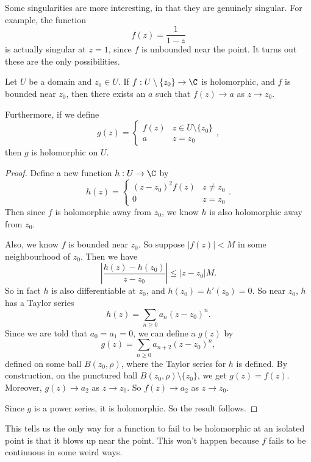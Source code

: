 \documentclass[a4paper]{article}
\begin{document}
Some singularities are more interesting, in that they are genuinely singular. For example, the function
\[
  f(z) = \frac{1}{1 - z}
\]
is actually singular at $z = 1$, since $f$ is unbounded near the point. It turns out these are the only possibilities.

\begin{prop}
  Let $U$ be a domain and $z_0 \in U$. If $f: U \setminus \{z_0\} \to \C$ is holomorphic, and $f$ is bounded near $z_0$, then there exists an $a$ such that $f(z) \to a$ as $z \to z_0$.

  Furthermore, if we define
  \[
    g(z) =
    \begin{cases}
      f(z) & z \in U \setminus \{z_0\}\\
      a & z = z_0
    \end{cases},
  \]
  then $g$ is holomorphic on $U$.
\end{prop}

\begin{proof}
  Define a new function $h: U \to \C$ by
  \[
    h(z) =
    \begin{cases}
      (z - z_0)^2 f(z) & z \not= z_0\\
      0 & z = z_0
    \end{cases}.
  \]
  Then since $f$ is holomorphic away from $z_0$, we know $h$ is also holomorphic away from $z_0$.

  Also, we know $f$ is bounded near $z_0$. So suppose $|f(z)| < M$ in some neighbourhood of $z_0$. Then we have
  \[
    \left|\frac{h(z) - h(z_0)}{ z - z_0}\right| \leq |z - z_0| M.
  \]
  So in fact $h$ is also differentiable at $z_0$, and $h(z_0) = h'(z_0) = 0$. So near $z_0$, $h$ has a Taylor series
  \[
    h(z) = \sum_{n \geq 0} a_n(z - z_0)^n.
  \]
  Since we are told that $a_0 = a_1 = 0$, we can define a $g(z)$ by
  \[
    g(z) = \sum_{n \geq 0} a_{n + 2} (z - z_0)^n,
  \]
  defined on some ball $B(z_0, \rho)$, where the Taylor series for $h$ is defined. By construction, on the punctured ball $B(z_0, \rho) \setminus \{z_0\}$, we get $g(z) = f(z)$. Moreover, $g(z) \to a_2$ as $z \to z_0$. So $f(z) \to a_2$ as $z \to z_0$.

  Since $g$ is a power series, it is holomorphic. So the result follows.
\end{proof}
This tells us the only way for a function to fail to be holomorphic at an isolated point is that it blows up near the point. This won't happen because $f$ fails to be continuous in some weird ways.
\end{document}

